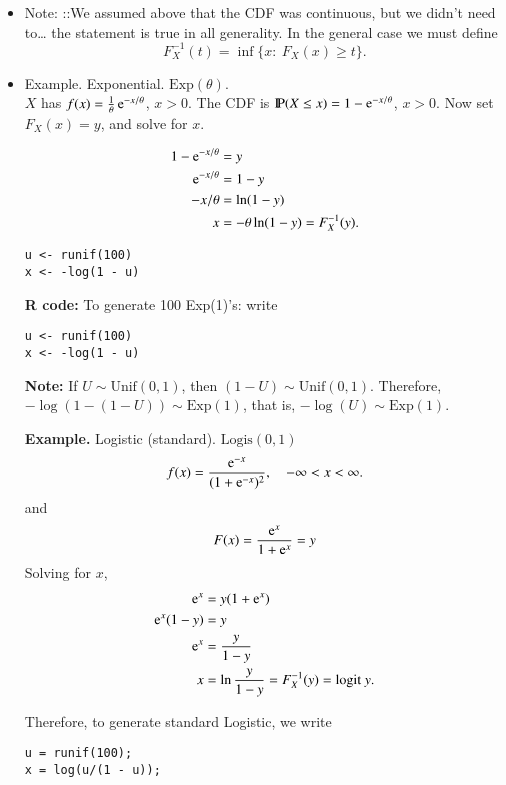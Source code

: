 \documentclass[captions=tableheading]{scrbook}
\begin{document}
\begin{itemize}
\item Note: ::We assumed above that the CDF was continuous, but we didn't need to\ldots{} the statement is true in all generality. In the general case we must define 
  \[
  F_{X}^{-1}(t)=\inf\{x:\ F_{X}(x)\geq t\}.
  \]
\end{itemize}
\begin{itemize}

\item Example. Exponential. \(\mathrm{Exp}(\theta)\).\\
\label{sec-2_3_1_1}%
$X$ has $f(x)=\frac{1}{\theta}\, \mathrm{e}^{-x/\theta}$, $x > 0$.  The CDF is $\mathrm{I\hspace{-1.5pt}P}(X\leq x)=1 - \mathrm{e}^{-x/\theta}$, $x > 0$. Now set $F_{X}(x) = y$, and solve for $x$. 

\begin{align*}
1 - \mathrm{e}^{-x/\theta} & = y\\
\mathrm{e}^{-x/\theta} & = 1 - y\\
-x/\theta & = \ln(1-y)\\
x & = -\theta\ln(1-y) = F_{X}^{-1}(y).
\end{align*}

\begin{verbatim}
u <- runif(100)
x <- -log(1 - u)
\end{verbatim}

\textbf{R code:} To generate 100 Exp(1)'s: write
\begin{verbatim}
u <- runif(100)
x <- -log(1 - u)
\end{verbatim}

\textbf{Note:} If \(U\sim \mathrm{Unif}(0,1)\), then \( (1-U)\sim \mathrm{Unif}(0,1) \). Therefore, \(-\log(1-(1-U))\sim \mathrm{Exp}(1)\), that is, \(-\log(U)\sim \mathrm{Exp}(1)\).

\textbf{Example.} Logistic (standard). \( \mathrm{Logis}(0,1) \)
\[
f(x)=\frac{\mathrm{e}^{-x}}{(1 + \mathrm{e}^{-x})^{2}},\quad -\infty < x <\infty.
\]
\vspace{1.5in}
and 
\[
F(x)=\frac{\mathrm{e}^{x}}{1 + \mathrm{e}^{x}} = y
\]
Solving for $x$, 
\begin{align*}
\mathrm{e}^{x} & = y(1 + \mathrm{e}^{x})\\
\mathrm{e}^{x}(1-y) & = y\\
\mathrm{e}^{x} & = \frac{y}{1 - y} \\
x & = \ln \frac{y}{1 - y} = F_{X}^{-1}(y) = \mbox{logit}\ y.
\end{align*}

Therefore, to generate standard Logistic, we write 
\begin{verbatim}
u = runif(100);
x = log(u/(1 - u));
\end{verbatim}



\end{itemize}
\end{document}
